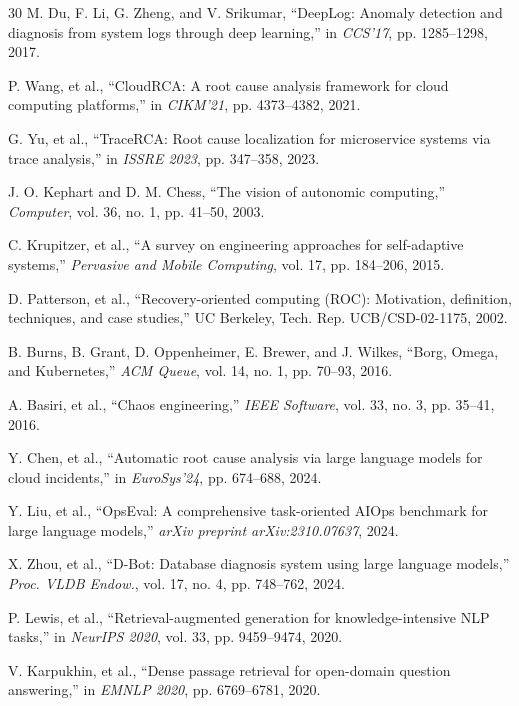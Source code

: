\documentclass[journal]{IEEEtran}
\begin{document}
\begin{thebibliography}{30}
M. Du, F. Li, G. Zheng, and V. Srikumar, ``DeepLog: Anomaly detection and diagnosis from system logs through deep learning,'' in \textit{CCS'17}, pp. 1285--1298, 2017.

P. Wang, et al., ``CloudRCA: A root cause analysis framework for cloud computing platforms,'' in \textit{CIKM'21}, pp. 4373--4382, 2021.

G. Yu, et al., ``TraceRCA: Root cause localization for microservice systems via trace analysis,'' in \textit{ISSRE 2023}, pp. 347--358, 2023.

J. O. Kephart and D. M. Chess, ``The vision of autonomic computing,'' \textit{Computer}, vol. 36, no. 1, pp. 41--50, 2003.

C. Krupitzer, et al., ``A survey on engineering approaches for self-adaptive systems,'' \textit{Pervasive and Mobile Computing}, vol. 17, pp. 184--206, 2015.

D. Patterson, et al., ``Recovery-oriented computing (ROC): Motivation, definition, techniques, and case studies,'' UC Berkeley, Tech. Rep. UCB/CSD-02-1175, 2002.

B. Burns, B. Grant, D. Oppenheimer, E. Brewer, and J. Wilkes, ``Borg, Omega, and Kubernetes,'' \textit{ACM Queue}, vol. 14, no. 1, pp. 70--93, 2016.

A. Basiri, et al., ``Chaos engineering,'' \textit{IEEE Software}, vol. 33, no. 3, pp. 35--41, 2016.

Y. Chen, et al., ``Automatic root cause analysis via large language models for cloud incidents,'' in \textit{EuroSys'24}, pp. 674--688, 2024.

Y. Liu, et al., ``OpsEval: A comprehensive task-oriented AIOps benchmark for large language models,'' \textit{arXiv preprint arXiv:2310.07637}, 2024.

X. Zhou, et al., ``D-Bot: Database diagnosis system using large language models,'' \textit{Proc. VLDB Endow.}, vol. 17, no. 4, pp. 748--762, 2024.

P. Lewis, et al., ``Retrieval-augmented generation for knowledge-intensive NLP tasks,'' in \textit{NeurIPS 2020}, vol. 33, pp. 9459--9474, 2020.

V. Karpukhin, et al., ``Dense passage retrieval for open-domain question answering,'' in \textit{EMNLP 2020}, pp. 6769--6781, 2020.


\end{thebibliography}
\end{document}
